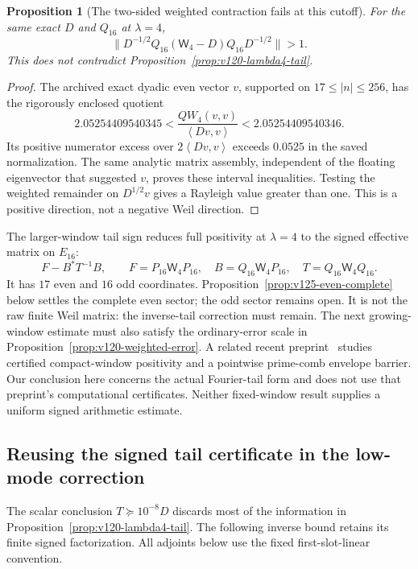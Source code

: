 \documentclass[11pt]{article}
\newtheorem{proposition}[theorem]{Proposition}
\theoremstyle{remark}
\newcommand{\ip}[2]{\left\langle #1,#2\right\rangle}
\begin{document}
\begin{proposition}[The two-sided weighted contraction fails at this cutoff]
\label{prop:v120-norm-counterexample}
For the same exact $D$ and $Q_{16}$ at $\lambda=4$,
\[
 \|D^{-1/2}Q_{16}(\mathsf W_4-D)Q_{16}D^{-1/2}\|>1.
\]
This does not contradict Proposition~\ref{prop:v120-lambda4-tail}.
\end{proposition}
\begin{proof}
The archived exact dyadic even vector $v$, supported on
$17\le|n|\le256$, has the rigorously enclosed quotient
\[
 2.05254409540345<\frac{QW_4(v,v)}{\ip{Dv}{v}}
                         <2.05254409540346.
\]
Its positive numerator excess over $2\ip{Dv}{v}$ exceeds
$0.0525$ in the saved normalization. The same analytic matrix
assembly, independent of the floating eigenvector that suggested
$v$, proves these interval inequalities. Testing the weighted
remainder on $D^{1/2}v$ gives a Rayleigh value greater than one.
This is a positive direction, not a negative Weil direction.
\end{proof}

The larger-window tail sign reduces full positivity at $\lambda=4$
to the signed effective matrix on
$E_{16}$:
\[
 F-B^*T^{-1}B,\qquad
 F=P_{16}\mathsf W_4P_{16},\quad B=Q_{16}\mathsf W_4P_{16},
 \quad T=Q_{16}\mathsf W_4Q_{16}.
\]
It has $17$ even and $16$ odd coordinates.
Proposition~\ref{prop:v125-even-complete} below settles the complete
even sector; the odd sector remains open. It is not the raw finite
Weil matrix: the inverse-tail correction must remain.
The next growing-window estimate must also satisfy the ordinary-error
scale in Proposition~\ref{prop:v120-weighted-error}.
A related recent preprint~\cite{Zhu2026Windows} studies certified
compact-window positivity and a pointwise prime-comb envelope barrier.
Our conclusion here concerns the actual Fourier-tail form and does
not use that preprint's computational certificates. Neither fixed-window
result supplies a uniform signed arithmetic estimate.

\subsection*{Reusing the signed tail certificate in the low-mode correction}
The scalar conclusion $T\succeq10^{-8}D$ discards most of the
information in Proposition~\ref{prop:v120-lambda4-tail}. The following
inverse bound retains its finite signed factorization. All adjoints
below use the fixed first-slot-linear convention.
\end{document}
